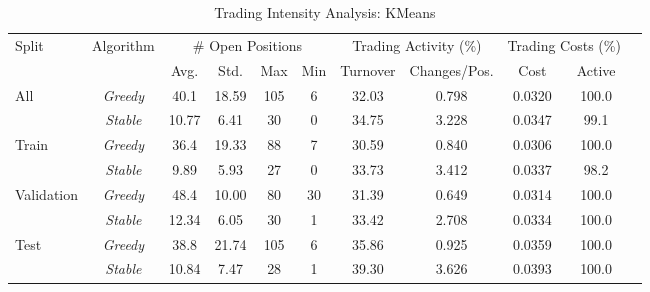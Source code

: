 
\begin{table}[htbp] 
\caption{Trading Intensity Analysis: KMeans} 
\centering 
\label{tab:KMeans_trading_intensity}
{\small
\begin{tabular}{lcccccccccc}
\toprule
Split & Algorithm & \multicolumn{4}{c}{\# Open Positions} & \multicolumn{2}{c}{Trading Activity (\%)} & \multicolumn{2}{c}{Trading Costs (\%)} \\
\cmidrule(lr{0.6em}){3-6} \cmidrule(lr{0.6em}){7-8} \cmidrule(lr{0.6em}){9-10}
& & Avg. & Std. & Max & Min & Turnover & Changes/Pos. & Cost & Active \\
\midrule
\multirow{2}{*}{All} & \textit{Greedy} & 40.1 & 18.59 & 105 & 6 & 32.03 & 0.798 & 0.0320 & 100.0 \\
 & \textit{Stable} & 10.77 & 6.41 & 30 & 0 & 34.75 & 3.228 & 0.0347 & 99.1 \\
\midrule
\multirow{2}{*}{Train} & \textit{Greedy} & 36.4 & 19.33 & 88 & 7 & 30.59 & 0.840 & 0.0306 & 100.0 \\
 & \textit{Stable} & 9.89 & 5.93 & 27 & 0 & 33.73 & 3.412 & 0.0337 & 98.2 \\
\midrule
\multirow{2}{*}{Validation} & \textit{Greedy} & 48.4 & 10.00 & 80 & 30 & 31.39 & 0.649 & 0.0314 & 100.0 \\
 & \textit{Stable} & 12.34 & 6.05 & 30 & 1 & 33.42 & 2.708 & 0.0334 & 100.0 \\
\midrule
\multirow{2}{*}{Test} & \textit{Greedy} & 38.8 & 21.74 & 105 & 6 & 35.86 & 0.925 & 0.0359 & 100.0 \\
 & \textit{Stable} & 10.84 & 7.47 & 28 & 1 & 39.30 & 3.626 & 0.0393 & 100.0 \\
\bottomrule
\end{tabular}
}


\end{table}
